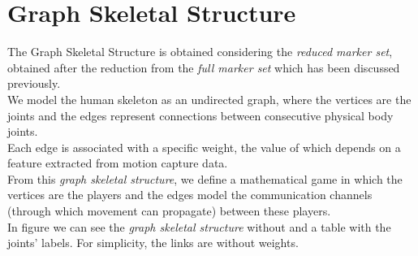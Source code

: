 \chapter{Graph Skeletal Structure}
The Graph Skeletal Structure is obtained considering the \textit{reduced marker set}, obtained after the reduction from the \textit{full marker set} which has been discussed previously. \\
We model the human skeleton as an undirected graph, where the vertices are the joints and the edges represent connections between consecutive physical body joints.\\
Each edge is associated with a specific weight, the value of which depends on a feature extracted from motion capture data. \\
From this \textit{graph skeletal structure}, we define a mathematical game in which the vertices are the players and the edges model the communication channels (through which movement can propagate) between these players. \\
In figure we can see the \textit{graph skeletal structure} without and a table with the joints' labels.
For simplicity, the links are without weights.

